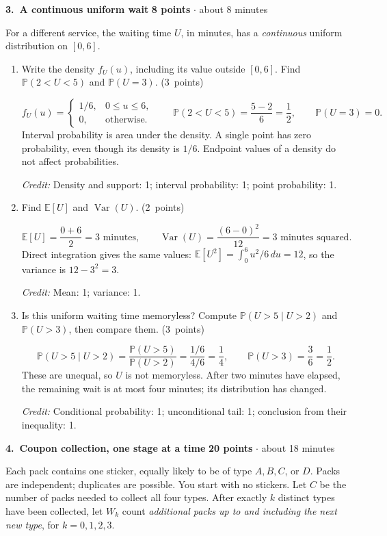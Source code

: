 \documentclass[11pt,letterpaper]{article}
\newcommand{\Prob}{\mathbb P}
\newcommand{\E}{\mathbb E}
\DeclareMathOperator{\Var}{Var}
\newcommand{\partpts}[1]{\unskip\nobreak\hspace{.3em}%
  \mbox{\small\color{muted}(#1 points)}}
\newcommand{\credit}[1]{\par{\footnotesize\color{muted}\textit{Credit:} #1}}
\newcommand{\problem}[4]{\par\addvspace{8pt}%
  {\large\bfseries\color{indigo}#1.\ #2}\hfill
  {\small\color{muted}\textbf{#3 points} $\cdot$ about #4 minutes}\par\nobreak}
\begin{document}
\newpage
\problem{3}{A continuous uniform wait}{8}{8}
For a different service, the waiting time $U$, in minutes, has a
\emph{continuous} uniform distribution on $[0,6]$.
\begin{enumerate}
  \item Write the density $f_U(u)$, including its value outside $[0,6]$.
  Find $\Prob(2<U<5)$ and $\Prob(U=3)$. \partpts{3}
  \begin{solution}[2in]
    \[
      f_U(u)=\begin{cases}1/6,&0\le u\le6,\\0,&\text{otherwise}.
      \end{cases}
      \qquad \Prob(2<U<5)=\frac{5-2}{6}=\frac12,
      \qquad \Prob(U=3)=0.
    \]
    Interval probability is area under the density. A single point
    has zero probability, even though its density is $1/6$.
    Endpoint values of a density do not affect probabilities.
    \credit{Density and support: 1; interval probability: 1;
    point probability: 1.}
  \end{solution}

  \item Find $\E[U]$ and $\Var(U)$. \partpts{2}
  \begin{solution}[1.5in]
    \[
      \E[U]=\frac{0+6}{2}=3\text{ minutes},
      \qquad \Var(U)=\frac{(6-0)^2}{12}=3\text{ minutes squared}.
    \]
    Direct integration gives the same values:
    $\E[U^2]=\int_0^6u^2/6\,du=12$, so the variance is $12-3^2=3$.
    \credit{Mean: 1; variance: 1.}
  \end{solution}

  \item Is this uniform waiting time memoryless? Compute
  $\Prob(U>5\mid U>2)$ and $\Prob(U>3)$, then compare them.
  \partpts{3}
  \begin{solution}[2in]
    \[
      \Prob(U>5\mid U>2)
        =\frac{\Prob(U>5)}{\Prob(U>2)}
        =\frac{1/6}{4/6}=\frac14,
      \qquad \Prob(U>3)=\frac36=\frac12.
    \]
    These are unequal, so $U$ is not memoryless. After two minutes
    have elapsed, the remaining wait is at most four minutes; its
    distribution has changed.
    \credit{Conditional probability: 1; unconditional tail: 1;
    conclusion from their inequality: 1.}
  \end{solution}
\end{enumerate}

\newpage
\problem{4}{Coupon collection, one stage at a time}{20}{18}
Each pack contains one sticker, equally likely to be of type $A,B,C$, or
$D$. Packs are independent; duplicates are possible. You start with no
stickers. Let $C$ be the number of packs needed to collect all four types.
After exactly $k$ distinct types have been collected, let $W_k$ count
\emph{additional packs up to and including the next new type}, for
$k=0,1,2,3$.
\end{document}
